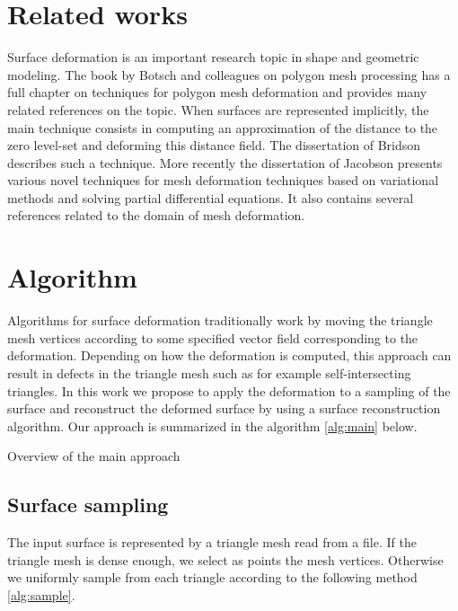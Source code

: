 \documentclass[ams]{U-AizuGT}
\begin{document}
\section{Related works}
Surface deformation is an important research topic in shape and geometric modeling. 
The book by Botsch and colleagues on polygon mesh processing \cite{BKPAL10} has a full 
chapter on techniques for polygon mesh deformation and provides many related references on the topic. 
When surfaces are represented implicitly, the main technique consists in computing an 
approximation of the distance to the zero level-set and deforming this distance field. 
The dissertation of Bridson \cite{B03} describes such a technique. 
More recently the dissertation of Jacobson \cite{J13} presents various novel techniques 
for mesh deformation techniques based on variational methods and solving partial differential equations. 
It also contains several references related to the domain of mesh deformation.


\section{Algorithm}
\label{algorithm}
Algorithms for surface deformation traditionally work by moving the triangle mesh vertices according to some specified vector field corresponding to the deformation. Depending on how the deformation is computed, this approach can result in defects in the triangle mesh such as for example self-intersecting triangles. In this work we propose to apply the deformation to a sampling of the surface and reconstruct the deformed surface by using a surface reconstruction algorithm. Our approach is summarized in the algorithm \ref{alg:main} below.

\begin{algorithm}
\caption{Overview of the main approach}
\label{alg:main}
\begin{algorithmic}
\end{algorithmic}
\end{algorithm}


\subsection{Surface sampling}
The input surface is represented by a triangle mesh read from a file. 
If the triangle mesh is dense enough, we select as points the mesh vertices. 
Otherwise we uniformly sample from each triangle according to the following method \ref{alg:sample}.
\end{document}
